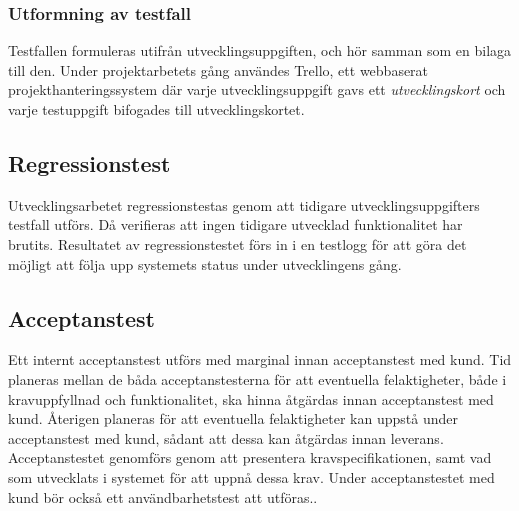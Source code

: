 \subsubsection{Utformning av testfall}
Testfallen formuleras utifrån utvecklingsuppgiften, och hör samman som en bilaga till den. Under projektarbetets gång användes Trello, ett webbaserat projekthanteringssystem där varje utvecklingsuppgift gavs ett \emph{utvecklingskort} och varje testuppgift bifogades till utvecklingskortet.\cite{website:trello}

\subsection{Regressionstest}
Utvecklingsarbetet regressionstestas genom att tidigare utvecklingsuppgifters testfall utförs. Då verifieras att ingen tidigare utvecklad funktionalitet har brutits. Resultatet av regressionstestet förs in i en testlogg för att göra det möjligt att följa upp systemets status under utvecklingens gång. 

\subsection{Acceptanstest}
Ett internt acceptanstest utförs med marginal innan acceptanstest med kund. Tid planeras mellan de båda acceptanstesterna för att eventuella felaktigheter, både i kravuppfyllnad och funktionalitet, ska hinna åtgärdas innan acceptanstest med kund. Återigen planeras för att eventuella felaktigheter kan uppstå under acceptanstest med kund, sådant att dessa kan åtgärdas innan leverans. Acceptanstestet genomförs genom att presentera kravspecifikationen, samt vad som utvecklats i systemet för att uppnå dessa krav. Under acceptanstestet med kund bör också ett användbarhetstest att utföras.\cite{arvolaboken}.



